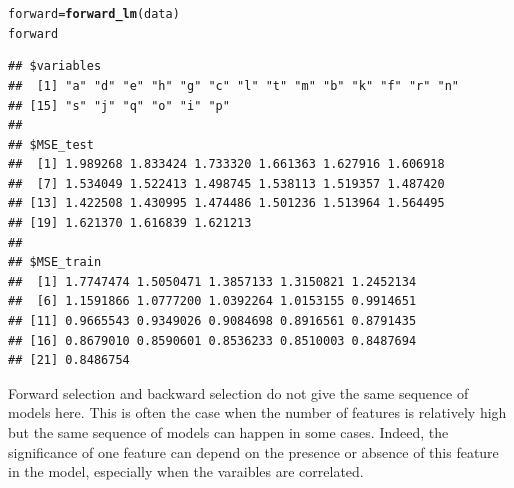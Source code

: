 \documentclass[11pt]{article}\usepackage[]{graphicx}\usepackage[]{color}
\makeatletter
\newcommand{\hlstd}[1]{\textcolor[rgb]{0.345,0.345,0.345}{#1}}%
\newcommand{\hlkwb}[1]{\textcolor[rgb]{0.69,0.353,0.396}{#1}}%
\newcommand{\hlkwd}[1]{\textcolor[rgb]{0.737,0.353,0.396}{\textbf{#1}}}%
\newenvironment{kframe}{%
 \def\at@end@of@kframe{}%
 \ifinner\ifhmode%
  \def\at@end@of@kframe{\end{minipage}}%
  \begin{minipage}{\columnwidth}%
 \fi\fi%
 \def\FrameCommand##1{\hskip\@totalleftmargin \hskip-\fboxsep
 \colorbox{shadecolor}{##1}\hskip-\fboxsep
     \hskip-\linewidth \hskip-\@totalleftmargin \hskip\columnwidth}%
 \MakeFramed {\advance\hsize-\width
   \@totalleftmargin\z@ \linewidth\hsize
   \@setminipage}}%
 {\par\unskip\endMakeFramed%
 \at@end@of@kframe}
\newenvironment{knitrout}{}{} %
\makeatother
\begin{document}
\begin{knitrout}
\begin{kframe}
\begin{alltt}
\hlstd{forward} \hlkwb{=} \hlkwd{forward_lm}\hlstd{(data)}
\hlstd{forward}
\end{alltt}
\begin{lstlisting}[basicstyle=\ttfamily,breaklines=true]
## $variables
##  [1] "a" "d" "e" "h" "g" "c" "l" "t" "m" "b" "k" "f" "r" "n"
## [15] "s" "j" "q" "o" "i" "p"
## 
## $MSE_test
##  [1] 1.989268 1.833424 1.733320 1.661363 1.627916 1.606918
##  [7] 1.534049 1.522413 1.498745 1.538113 1.519357 1.487420
## [13] 1.422508 1.430995 1.474486 1.501236 1.513964 1.564495
## [19] 1.621370 1.616839 1.621213
## 
## $MSE_train
##  [1] 1.7747474 1.5050471 1.3857133 1.3150821 1.2452134
##  [6] 1.1591866 1.0777200 1.0392264 1.0153155 0.9914651
## [11] 0.9665543 0.9349026 0.9084698 0.8916561 0.8791435
## [16] 0.8679010 0.8590601 0.8536233 0.8510003 0.8487694
## [21] 0.8486754
\end{lstlisting}
\end{kframe}
\end{knitrout}
Forward selection and backward selection do not give the same sequence of models here. This is often the case when the number of features is relatively high but the same sequence of models can happen in some cases.
Indeed, the significance of one feature can depend on the presence or absence of this feature in the model, especially when the varaibles are correlated.


\section{}
\end{document}
